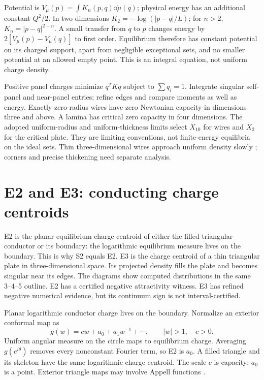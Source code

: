 \documentclass[11pt,oneside,openany]{book}
\begin{document}
Potential is $V_\mu(p)=\int K_n(p,q)\dd\mu(q)$; physical energy has
an additional constant $Q^2/2$. In two dimensions
$K_2=-\log(|p-q|/L)$; for $n>2$, $K_n=|p-q|^{2-n}$.
A small transfer from $q$ to $p$ changes energy by
$2[V_\mu(p)-V_\mu(q)]$ to first order. Equilibrium therefore has
constant potential on its charged support, apart from negligible
exceptional sets, and no smaller potential at an allowed empty point.
This is an integral equation, not uniform charge density.

Positive panel charges minimize $q^TKq$ subject to $\sum q_i=1$.
Integrate singular self-panel and near-panel entries; refine edges
and compare moments as well as energy.
Exactly zero-radius wires have zero Newtonian capacity in dimensions
three and above. A lamina has critical zero capacity in four dimensions.
The adopted uniform-radius and uniform-thickness limits select
$X_{10}$ for wires and $X_2$ for the critical plate. They are limiting
conventions, not finite-energy equilibria on the ideal sets.
Thin three-dimensional wires approach uniform density slowly
\cite{wire}; corners and precise thickening need separate analysis.




\section{E2 and E3: conducting charge centroids}\label{sec:slide19}

E2 is the planar equilibrium-charge centroid of either the filled triangular conductor or its boundary: the logarithmic equilibrium measure lives on the boundary. This is why S2 equals E2. E3 is the charge centroid of a thin triangular plate in three-dimensional space. Its projected density fills the plate and becomes singular near its edges. The diagrams show computed distributions in the same 3--4--5 outline. E2 has a certified negative attractivity witness. E3 has refined negative numerical evidence, but its continuum sign is not interval-certified.



Planar logarithmic conductor charge lives on the boundary. Normalize
an exterior conformal map as
\[
g(w)=cw+a_0+a_1w^{-1}+\cdots,\qquad |w|>1,\quad c>0.
\]
Uniform angular measure on the circle maps to equilibrium charge.
Averaging $g(e^{i\theta})$ removes every nonconstant Fourier term,
so E2 is $a_0$. A filled triangle and its skeleton have the same
logarithmic charge centroid. The scale $c$ is capacity; $a_0$ is a
point. Exterior triangle maps may involve Appell functions \cite{finch}.
\end{document}
